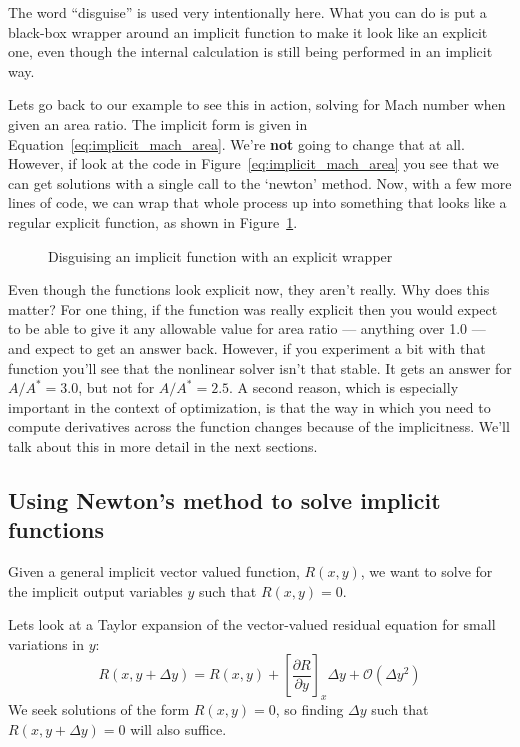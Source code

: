 \documentclass[conf]{new-aiaa}
\begin{document}
The word ``disguise'' is used very intentionally here. What you can do is put a black-box wrapper around an implicit function to make it look like an explicit one, even though the internal calculation is still being performed in an implicit way. 

Lets go back to our example to see this in action, solving for Mach number when given an area ratio. 
The implicit form is given in Equation~\ref{eq:implicit_mach_area}. 
We're \textbf{not} going to change that at all. 
However, if look at the code in Figure~\ref{eq:implicit_mach_area} you see that we can get solutions with a single call to the `newton' method. 
Now, with a few more lines of code, we can wrap that whole process up into something that looks like a regular explicit function, as shown in Figure~\ref{fig:mach-area-fake-explicit}. 
\begin{figure}[H]
    \centering
    
    \caption{Disguising an implicit function with an explicit wrapper}
    \label{fig:mach-area-fake-explicit}
\end{figure}

Even though the functions look explicit now, they aren't really. 
Why does this matter? 
For one thing, if the function was really explicit then you would expect to be able to give it any allowable value for area ratio --- anything over 1.0 --- and expect to get an answer back. 
However, if you experiment a bit with that function you'll see that the nonlinear solver isn't that stable. 
It gets an answer for $A/A^*=3.0$, but not for $A/A^*=2.5$. 
A second reason, which is especially important in the context of optimization, is that the way in which you need to compute derivatives across the function changes because of the implicitness. 
We'll talk about this in more detail in the next sections. 


\subsection*{Using Newton's method to solve implicit functions}

Given a general implicit vector valued function, $R(x,y)$, we want to solve for the implicit output variables $y$ such that $R(x,y)=0$. 

Lets look at a Taylor expansion of the vector-valued residual equation for small variations in $y$: 
\begin{equation}
    R(x,y+\Delta y) = R(x,y) + \left[ \frac{\partial R}{\partial y} \right]_{x} \Delta y + \mathcal{O}( \Delta y^2)
    \label{eq:newton_taylor}
\end{equation}
We seek solutions of the form $R(x,y)=0$, so finding $\Delta y$ such that $R(x,y+\Delta y)=0$ will also suffice. 
\end{document}
